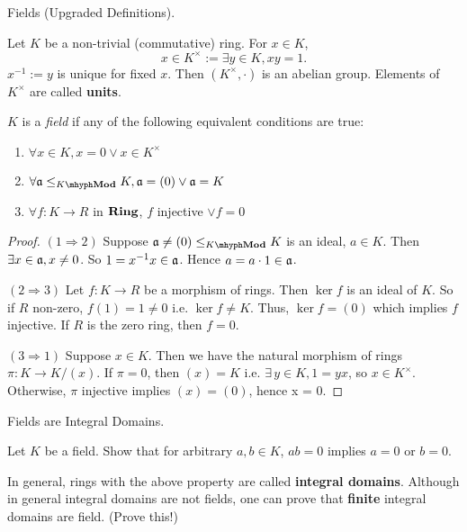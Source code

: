 \documentclass[../../book.tex]{subfiles}
\begin{document}
\begin{dfn} Fields (Upgraded Definitions).

    Let $K$ be a non-trivial (commutative) ring. 
    For $x \in K$, 
    \[
        x \in K^\times := \exists y \in K, xy = 1. 
    \]
    $x^{-1} := y$ is unique for fixed $x$. 
    Then $(K^\times, \cdot)$ is an abelian group. 
    Elements of $K^\times$ are called \textbf{units}. 

    $K$ is a \emph{field} if any of the following equivalent conditions are true:
    \begin{enumerate}
        \item $\forall x \in K, x = 0 \lor x \in K^\times$
        \item $\forall \fa \leq_{\mod{K}} K, \fa = (0) \lor \fa = K$
        \item $\forall f : K \to R$ in $\mathbf{Ring}$, $f$ injective $\lor f = 0$
    \end{enumerate}
\end{dfn}
\begin{proof} 
    $(1 \Rightarrow  2)$
    Suppose $\fa \neq (0) \leq_{\mod{K}} K$ is an ideal, $a \in K$. 
    Then $\exists x \in \mathfrak{a}, x \neq 0$.
    So $1 = x^{-1} x \in \mathfrak{a}$. 
    Hence $a = a\cdot1 \in \mathfrak{a}$. 

    $(2 \Rightarrow 3)$ 
    Let $f : K \to R$ be a morphism of rings. 
    Then $\ker f$ is an ideal of $K$. 
    So if $R$ non-zero, $f(1) = 1 \neq 0$ i.e. $\ker f \neq K$. 
    Thus, $\ker f = (0)$ which implies $f$ injective.  
    If $R$ is the zero ring, then $f = 0$. 

    $(3 \Rightarrow 1)$ 
    Suppose $x \in K$. 
    Then we have the natural morphism of rings $\pi : K \to K/(x)$. 
    If $\pi = 0$, then $(x) = K$ i.e. $\exists\,y \in K, 1 = yx$,
    so $x \in K^\times$. 
    Otherwise, $\pi$ injective implies $(x) = (0)$, hence x = 0. 
\end{proof}

\begin{ex} [Important] Fields are Integral Domains.
    
    Let $K$ be a field. 
    Show that for arbitrary $a, b \in K$, $ab = 0$ implies $a = 0$ or $b = 0$.
    
    In general, rings with the above property are called \textbf{integral domains}. 
    Although in general integral domains are not fields, 
    one can prove that \textbf{finite} integral domains are field. 
    (Prove this!)
\end{ex}
\end{document}
